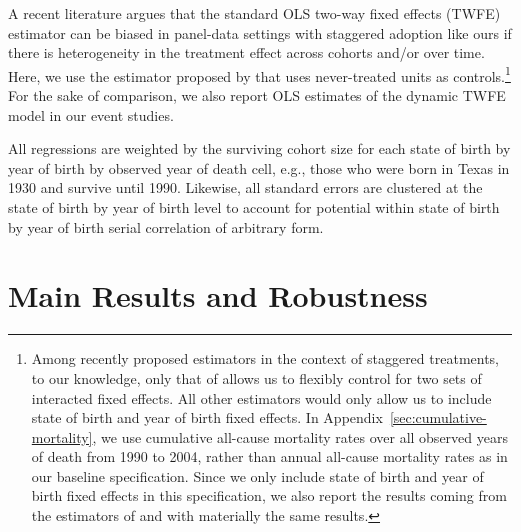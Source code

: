 \documentclass[12pt]{article}
\begin{document}
A recent literature argues that the standard OLS two-way fixed effects (TWFE) estimator can be biased in panel-data settings with staggered adoption like ours if there is heterogeneity in the treatment effect across cohorts and/or over time. 
Here, we use the estimator proposed by  that uses never-treated units as controls.\footnote{
    Among recently proposed estimators in the context of staggered treatments, to our knowledge, only that of   allows us to flexibly control for two sets of interacted fixed effects. 
    All other estimators would only allow us to include state of birth and year of birth fixed effects. 
    In Appendix~\ref{sec:cumulative-mortality}, we use cumulative all-cause mortality rates over all observed years of death from 1990 to 2004, rather than annual all-cause mortality rates as in our baseline specification. 
    Since we only include state of birth and year of birth fixed effects in this specification, we also report the results coming from the estimators of  and  with materially the same results. 
}  
For the sake of comparison, we also report OLS estimates of the dynamic TWFE model in our event studies. 

All regressions are weighted by the surviving cohort size for each state of birth by year of birth by observed year of death cell, e.g., those who were born in Texas in 1930 and survive until 1990. 
Likewise, all standard errors are clustered at the state of birth by year of birth level to account for potential within state of birth by year of birth serial correlation of arbitrary form. 


\section{Main Results and Robustness} \label{sec:results}
\end{document}
